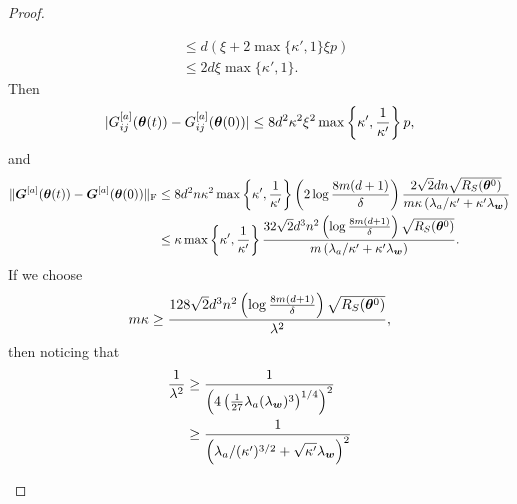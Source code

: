 \documentclass[twoside,11pt]{article}
\begin{document}
\begin{proof}
\begin{enumerate}[(a)]
\begin{enumerate}[(i)]
\begin{equation*}
\begin{aligned}
                                 & \leq d\left(\xi+2\max\{\kappa',1\}\xi p\right)                                    \\
                                 & \leq 2d\xi\max\{\kappa',1\}.
                            \end{aligned}
                        \end{equation*}
                        Then
                        \begin{equation*}
                            \lvert G_{ij}^{[a]}(\bm{\theta}(t)) - G_{ij}^{[a]}(\bm{\theta}(0))\rvert \leq 8d^2\kappa^2\xi^2\max\left\{\kappa',\frac{1}{\kappa'}\right\}p,
                        \end{equation*}
                        and
                        \begin{equation*}
                            \begin{aligned}
                                \lVert\bm{G}^{[a]}(\bm{\theta}(t)) - \bm{G}^{[a]}(\bm{\theta}(0))\rVert_\mathrm{F}
                                 & \leq 8d^2n\kappa^2\max\left\{\kappa',\frac{1}{\kappa'}\right\}\left(2\log\frac{8m(d+1)}{\delta}\right)\frac{2\sqrt{2}dn\sqrt{R_S(\bm{\theta}^0)}}{m\kappa\left(\lambda_a/\kappa'+\kappa'\lambda_{\bm{w}}\right)} \\
                                 & \leq\kappa\max\left\{\kappa',\frac{1}{\kappa'}\right\}\frac{32\sqrt{2}d^3n^2\left(\log\frac{8m(d+1)}{\delta}\right)\sqrt{R_S(\bm{\theta}^0)}}{m\left(\lambda_a/\kappa'+\kappa'\lambda_{\bm{w}}\right)}.
                            \end{aligned}
                        \end{equation*}
                        If we choose
                        \begin{equation}\label{cond:m1}
                            m\kappa\geq\frac{128\sqrt{2}d^3n^2\left(\log\frac{8m(d+1)}{\delta}\right)\sqrt{R_S(\bm{\theta}^0)}}{\lambda^2},
                        \end{equation}
                        then noticing that
                        \begin{equation*}
                            \begin{aligned}
                                \frac{1}{\lambda^2}
                                 & \geq\frac{1}{\left(4\left(\frac{1}{27}\lambda_a(\lambda_{\vw})^3\right)^{1/4}\right) ^2} \\
                                 & \geq\frac{1}{\left(\lambda_a/(\kappa')^{3/2}+\sqrt{\kappa'}\lambda_{\vw}\right)^2}                \\

\end{aligned}
\end{equation*}
\end{enumerate}
\end{enumerate}
\end{proof}
\end{document}
